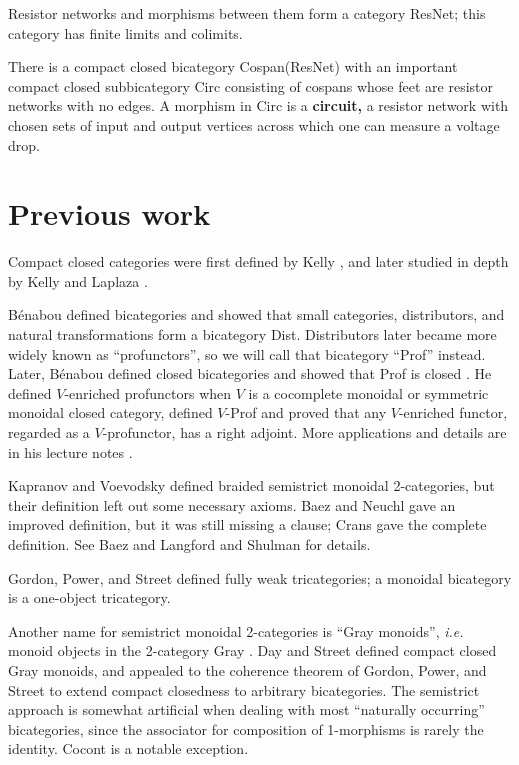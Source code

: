 \documentclass[12pt,twoside,openright]{report}
\begin{document}
\begin{itemize}
    Resistor networks and morphisms between them form a category ResNet; this category has finite limits and colimits.
    
    There is a compact closed bicategory Cospan(ResNet) with an important compact closed subbicategory Circ consisting of cospans whose feet are resistor networks with no edges.  A morphism in Circ is a {\bf circuit,} a resistor network with chosen sets of input and output vertices across which one can measure a voltage drop.
\end{itemize}

\section{Previous work}
\label{previous}

Compact closed categories were first defined by Kelly \cite{KellyCC}, and later studied in depth by Kelly and Laplaza \cite{KellyLaplaza}.

B\'enabou \cite{Ben67} defined bicategories and showed that small categories, distributors, and natural transformations form a bicategory Dist.  Distributors later became more widely known as ``profunctors'', so we will call that bicategory ``Prof'' instead.  Later, B\'enabou defined closed bicategories and showed that Prof is closed  \cite
{Ben73}.  He defined $V$-enriched profunctors when $V$ is a cocomplete monoidal or symmetric monoidal closed category, defined $V$-Prof and proved that any $V$-enriched functor, regarded as a $V$-profunctor, has a right adjoint.  More applications and details are in his lecture notes
\cite{Ben00}.

Kapranov and Voevodsky \cite{KV94} defined braided semistrict monoidal 2-categories, but their definition left out some necessary axioms.  Baez and Neuchl \cite{HDA1} gave an improved definition, but it was still missing a clause; Crans \cite{Crans} gave the complete definition.  See Baez and Langford \cite{HDA4} and Shulman \cite{Shulman} for details.

Gordon, Power, and Street \cite{GPS} defined fully weak tricategories; a monoidal bicategory is a one-object tricategory.

Another name for semistrict monoidal 2-categories is ``Gray monoids'', {\em i.e.} monoid objects in the 2-category Gray \cite{Gray}.  Day and Street \cite{DS97} defined compact closed Gray monoids, and appealed to the coherence theorem of Gordon, Power, and Street to extend compact closedness to arbitrary bicategories.  The semistrict approach is somewhat artificial when dealing with most ``naturally occurring'' bicategories, since the associator for composition of 1-morphisms is rarely the identity.  Cocont is a notable exception.
\end{document}
